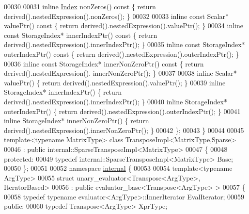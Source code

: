 \begin{DoxyCode}
00030 
00031     \textcolor{keyword}{inline} \hyperlink{group___core___module_a554f30542cc2316add4b1ea0a492ff02}{Index} nonZeros()\textcolor{keyword}{ const }\{ \textcolor{keywordflow}{return} derived().nestedExpression().nonZeros(); \}
00032     
00033     \textcolor{keyword}{inline} \textcolor{keyword}{const} Scalar* valuePtr()\textcolor{keyword}{ const }\{ \textcolor{keywordflow}{return} derived().nestedExpression().valuePtr(); \}
00034     \textcolor{keyword}{inline} \textcolor{keyword}{const} StorageIndex* innerIndexPtr()\textcolor{keyword}{ const }\{ \textcolor{keywordflow}{return} derived().nestedExpression().innerIndexPtr();
       \}
00035     \textcolor{keyword}{inline} \textcolor{keyword}{const} StorageIndex* outerIndexPtr()\textcolor{keyword}{ const }\{ \textcolor{keywordflow}{return} derived().nestedExpression().outerIndexPtr();
       \}
00036     \textcolor{keyword}{inline} \textcolor{keyword}{const} StorageIndex* innerNonZeroPtr()\textcolor{keyword}{ const }\{ \textcolor{keywordflow}{return} derived().nestedExpression().
      innerNonZeroPtr(); \}
00037 
00038     \textcolor{keyword}{inline} Scalar* valuePtr() \{ \textcolor{keywordflow}{return} derived().nestedExpression().valuePtr(); \}
00039     \textcolor{keyword}{inline} StorageIndex* innerIndexPtr() \{ \textcolor{keywordflow}{return} derived().nestedExpression().innerIndexPtr(); \}
00040     \textcolor{keyword}{inline} StorageIndex* outerIndexPtr() \{ \textcolor{keywordflow}{return} derived().nestedExpression().outerIndexPtr(); \}
00041     \textcolor{keyword}{inline} StorageIndex* innerNonZeroPtr() \{ \textcolor{keywordflow}{return} derived().nestedExpression().innerNonZeroPtr(); \}
00042   \};
00043 \}
00044   
00045 \textcolor{keyword}{template}<\textcolor{keyword}{typename} MatrixType> \textcolor{keyword}{class }TransposeImpl<MatrixType,Sparse>
00046   : \textcolor{keyword}{public} internal::SparseTransposeImpl<MatrixType>
00047 \{
00048   \textcolor{keyword}{protected}:
00049     \textcolor{keyword}{typedef} internal::SparseTransposeImpl<MatrixType> Base;
00050 \};
00051 
00052 \textcolor{keyword}{namespace }\hyperlink{namespaceinternal}{internal} \{
00053   
00054 \textcolor{keyword}{template}<\textcolor{keyword}{typename} ArgType>
00055 \textcolor{keyword}{struct }unary\_evaluator<Transpose<ArgType>, IteratorBased>
00056   : \textcolor{keyword}{public} evaluator\_base<Transpose<ArgType> >
00057 \{
00058     \textcolor{keyword}{typedef} \textcolor{keyword}{typename} evaluator<ArgType>::InnerIterator        EvalIterator;
00059   \textcolor{keyword}{public}:
00060     \textcolor{keyword}{typedef} Transpose<ArgType> XprType;

\end{DoxyCode}
